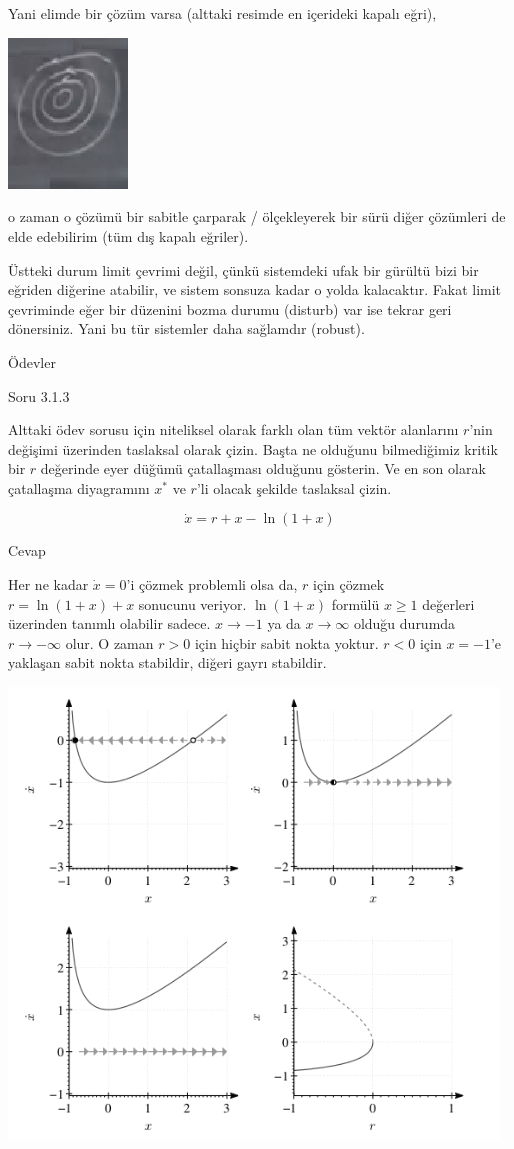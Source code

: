 \documentclass[12pt,fleqn]{article}\usepackage{../../common}
\begin{document}
Yani elimde bir çözüm varsa (alttaki resimde en içerideki kapalı eğri), 

\includegraphics[height=4cm]{08_40.png}

o zaman o çözümü bir sabitle çarparak / ölçekleyerek bir sürü diğer çözümleri de
elde edebilirim (tüm dış kapalı eğriler).

Üstteki durum limit çevrimi değil, çünkü sistemdeki ufak bir gürültü bizi bir
eğriden diğerine atabilir, ve sistem sonsuza kadar o yolda kalacaktır. Fakat
limit çevriminde eğer bir düzenini bozma durumu (disturb) var ise tekrar geri
dönersiniz. Yani bu tür sistemler daha sağlamdır (robust).

Ödevler

Soru 3.1.3

Alttaki ödev sorusu için niteliksel olarak farklı olan tüm vektör alanlarını
$r$'nin değişimi üzerinden taslaksal olarak çizin. Başta ne olduğunu
bilmediğimiz kritik bir $r$ değerinde eyer düğümü çatallaşması olduğunu
gösterin. Ve en son olarak çatallaşma diyagramını $x^*$ ve $r$'li olacak şekilde
taslaksal çizin.

$$ \dot{x} = r + x - \ln(1+x) $$

Cevap

Her ne kadar $\dot{x}=0$'i çözmek problemli olsa da, $r$ için çözmek
$r=\ln(1+x)+x$ sonucunu veriyor. $\ln(1+x)$ formülü $x \ge 1$ değerleri
üzerinden tanımlı olabilir sadece. $x \to -1$ ya da $x \to \infty$ olduğu
durumda $r \to -\infty$ olur. O zaman $r>0$ için hiçbir sabit nokta
yoktur. $r<0$ için $x=-1$'e yaklaşan sabit nokta stabildir, diğeri gayrı
stabildir.

\includegraphics[height=12cm]{08_01.png}
\end{document}
